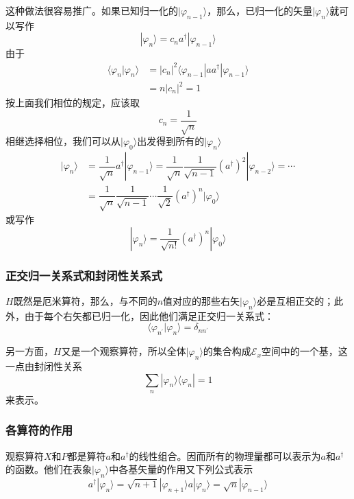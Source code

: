 \documentclass[]{article}
\begin{document}
这种做法很容易推广。如果已知归一化的$|\varphi_{n-1}\rangle$，那么，已归一化的矢量$|\varphi_n\rangle$就可以写作
\begin{equation}
	|\varphi_n\rangle=c_na^\dagger|\varphi_{n-1}\rangle
\end{equation}
由于
\begin{align}
	\langle\varphi_n|\varphi_n\rangle&=|c_n|^2\langle\varphi_{n-1}|aa^\dagger|\varphi_{n-1}\rangle\nonumber\\
	&=n|c_n|^2=1
\end{align}
按上面我们相位的规定，应该取
\begin{equation}
	c_n=\dfrac{1}{\sqrt{n}}
\end{equation}
相继选择相位，我们可以从$|\varphi_0\rangle$出发得到所有的$|\varphi_n\rangle$
\begin{align}
	|\varphi_n\rangle&=\dfrac{1}{\sqrt{n}}a^\dagger|\varphi_{n-1}\rangle=\dfrac{1}{\sqrt{n}}\dfrac{1}{\sqrt{n-1}}(a^\dagger)^2|\varphi_{n-2}\rangle=\cdots\nonumber\\
	&=\dfrac{1}{\sqrt{n}}\dfrac{1}{\sqrt{n-1}}\cdots\dfrac{1}{\sqrt{2}}(a^\dagger)^n|\varphi_{0}\rangle
\end{align}
或写作
\begin{equation}
	|\varphi_n\rangle=\dfrac{1}{\sqrt{n!}}(a^\dagger)^n|\varphi_{0}\rangle
	\label{c13c13}
\end{equation}
\subsubsection{正交归一关系式和封闭性关系式}
$H$既然是厄米算符，那么，与不同的$n$值对应的那些右矢$|\varphi_n\rangle$必是互相正交的；此外，由于每个右矢都已归一化，因此他们满足正交归一关系式：
\begin{equation}
	\langle\varphi_{n^\prime}|\varphi_n\rangle=\delta_{nn^\prime}
\end{equation}

另一方面，$H$又是一个观察算符，所以全体$|\varphi_n\rangle$的集合构成$\mathscr{E}_x$空间中的一个基，这一点由封闭性关系
\begin{equation}
	\sum\limits_{n}|\varphi_n\rangle\langle\varphi_n|=1
\end{equation}
来表示。
\subsubsection{各算符的作用}
观察算符$X$和$P$都是算符$a$和$a^\dagger$的线性组合。因而所有的物理量都可以表示为$a$和$a^\dagger$的函数。他们在表象${|\varphi_n\rangle}$中各基矢量的作用又下列公式表示
\begin{subequations}
	\begin{equation}
		a^\dagger|\varphi_n\rangle=\sqrt{n+1}|\varphi_{n+1}\rangle
	\end{equation}
	\begin{equation}
		a|\varphi_n\rangle=\sqrt{n}|\varphi_{n-1}\rangle
	\end{equation}
\end{subequations}
\end{document}
